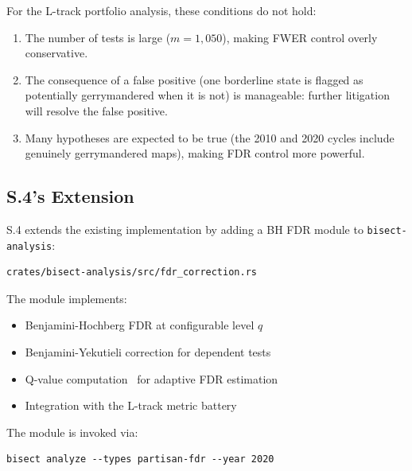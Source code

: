 For the L-track portfolio analysis, these conditions do not hold:
\begin{enumerate}
\item The number of tests is large ($m = 1{,}050$), making FWER control
  overly conservative.
\item The consequence of a false positive (one borderline state is
  flagged as potentially gerrymandered when it is not) is manageable:
  further litigation will resolve the false positive.
\item Many hypotheses are expected to be true (the 2010 and 2020 cycles
  include genuinely gerrymandered maps), making FDR control more
  powerful.
\end{enumerate}

\subsection{S.4's Extension}

S.4 extends the existing implementation by adding a BH FDR module to
\texttt{bisect-analysis}:
\begin{verbatim}
crates/bisect-analysis/src/fdr_correction.rs
\end{verbatim}

The module implements:
\begin{itemize}
\item Benjamini-Hochberg FDR at configurable level $q$
\item Benjamini-Yekutieli correction for dependent tests
\item Q-value computation~\citep{storey2002direct} for adaptive FDR estimation
\item Integration with the L-track metric battery
\end{itemize}

The module is invoked via:
\begin{verbatim}
bisect analyze --types partisan-fdr --year 2020
\end{verbatim}
